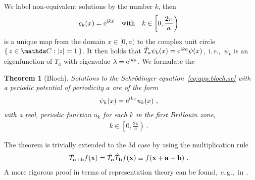 \documentclass[a4paper,12pt]{book}
\newcommand{\im}{{\rm i}}
\newtheorem*{thm}{Theorem}
\begin{document}
We label non-equivalent solutions by the number $k$, then
\begin{align}
	c_k (x) = {\rm e}^{\im k x}
	\quad\text{with}\quad k \in \left[0, \frac{2 \pi}{a} \right)
\end{align}
is a unique map from the domain $x \in [0, a)$ to the complex unit circle $\set{z \in \mathds C : \lvert z \rvert = 1}$. It then holds that $\hat T_a \psi_k (x) = {\rm e}^{\im k a} \psi(x)$,~i.\,e.,~$\psi_k$ is an eigenfunction of $\hat T_a$ with eigenvalue $\lambda = {\rm e}^{\im k a}$. We formulate the
\begin{thm}[Bloch]
	Solutions to the Schr\"odinger equation~\eqref{eq:app.bloch.se} with a periodic potential of periodicity $a$ are of the form
	\begin{align*}
		\psi_k (x) = {\rm e}^{\im k x} u_k (x)~,
	\end{align*}
	with a real, periodic function $u_k$ for each $k$ in the first Brillouin zone,
	\begin{align*}
		k \in \left[0, \frac{2 \pi}{a} \right)~.
	\end{align*}
\end{thm}
The theorem is trivially extended to the 3d case by using the multiplication rule
\begin{align}
	\hat{T}_{{\bf a} + {\bf b}} f({\bf x}) = \hat{T}_{\bf a} \hat{T}_{\bf b} f({\bf x}) \equiv f({\bf x} + {\bf a} + {\bf b})~.
\end{align}
A more rigorous proof in terms of representation theory can be found,~e.\,g.,~in~\cite{Dresselhaus2007}.
\end{document}
